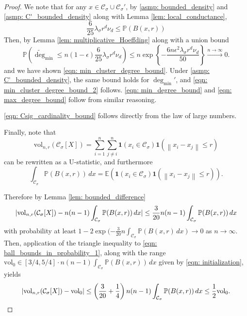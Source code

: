 \documentclass[11pt,twoside]{article}
\DeclarePairedDelimiter\abs{\lvert}{\rvert}
\newcommand{\set}[1]{\left\{#1\right\}}
\newcommand{\vol}{\mathrm{vol}}
\newcommand{\norm}[1]{\left\lVert#1\right\rVert}
\newcommand{\1}{\mathbf{1}}
\newcommand{\Xbf}{X}             %
\newcommand{\Pbb}{\mathbb{P}}
\newcommand{\Ebb}{\mathbb{E}}
\newcommand{\Cset}{\mathcal{C}}
\newcommand{\Csig}{\Cset_{\sigma}}
\newcommand{\degminpr}{\deg_{\min}'}
\newcommand{\degminwt}{\widetilde{\deg}_{\min}}
\newcommand{\dx}{\,dx}
\begin{document}
\begin{proof}
	We note that for any $x \in \Csig \cup \Csig'$, by \ref{asmp: bounded_density} and \ref{asmp: C'_bounded_density} along with Lemma \ref{lem: local_conductance},
	\begin{equation*}
	\frac{6}{25} \lambda_{\sigma} r^d \nu_d \leq \Pbb(B(x,r))
	\end{equation*}
	Then, by Lemma \ref{lem: multiplicative_Hoeffding} along with a union bound
	\begin{equation*}
	\Pbb \left(\degminwt \leq n (1 - \epsilon) \frac{6}{25}  \lambda_{\sigma} r^d \nu_d \right) \leq n \exp\set{- \frac{6 n \epsilon^2  \lambda_{\sigma} r^d \nu_d}{50} } \overset{n \to \infty}{\longrightarrow} 0.
	\end{equation*}
	and we have shown \eqref{eqn: min_cluster_degree_bound}. Under \ref{asmp: C'_bounded_density}, the same bound holds for $\degminpr$, and \eqref{eqn: min_cluster_degree_bound_2} follows. \eqref{eqn: min_degree_bound} and \eqref{eqn: max_degree_bound} follow from similar reasoning.
	
	\eqref{eqn: Csig_cardinality_bound} follows directly from the law of large numbers.
	
	Finally, note that
	\begin{equation*}
	\vol_{n,r}(\Csig[\Xbf]) = \sum_{i = 1}^{n} \sum_{j \neq i}^{n} \1(x_i \in \Csig) \1(\norm{x_i - x_j} \leq r)
	\end{equation*}
	can be rewritten as a U-statistic, and furthermore
	\begin{equation*}
	\int_{\Csig} \Pbb(B(x,r)) \dx = \Ebb\left(\1(x_i \in \Csig) \1(\norm{x_i - x_j} \leq r)\right).
	\end{equation*}
	
	Therefore by Lemma \ref{lem: bounded_difference}
	\begin{equation}
	\label{eqn: ball_bounds_in_probability_1}
	\abs{\vol_{n,r}(\Csig[\Xbf]) - n(n-1)\int_{\Csig} \Pbb(B(x,r)) \dx }\leq \frac{3}{20}n(n-1)\int_{\Csig} \Pbb(B(x,r)) \dx 
	\end{equation}
	with probability at least $1 - 2\exp(-\frac{3}{20}n \int_{\Csig} \Pbb(B(x,r) \dx) \to 0$ as $n \to \infty$. Then, application of the triangle inequality to \eqref{eqn: ball_bounds_in_probability_1}, along with the range $\vol_0 \in [3/4,5/4] \cdot n(n-1)\int_{\Csig} \Pbb(B(x,r)) \dx$ given by \eqref{eqn: initialization}, yields
	\begin{equation*}
	\abs{\vol_{n,r}(\Csig[\Xbf]) - \vol_0} \leq \left(\frac{3}{20} + \frac{1}{4}\right) n(n-1)\int_{\Csig} \Pbb(B(x,r)) \dx \leq \frac{1}{2} \vol_0.
	\end{equation*}
	

\end{proof}
\end{document}
